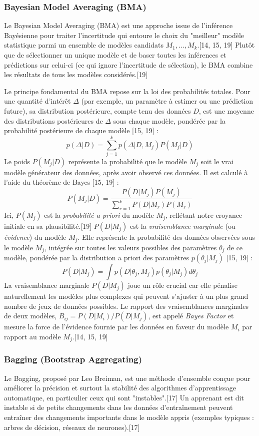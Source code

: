 \documentclass[11pt,a4paper]{article}
\begin{document}
\subsubsection{Bayesian Model Averaging (BMA)}
Le Bayesian Model Averaging (BMA) est une approche issue de l'inférence Bayésienne pour traiter l'incertitude qui entoure le choix du "meilleur" modèle statistique parmi un ensemble de modèles candidats $M_1, \dots, M_k$.[14, 15, 19] Plutôt que de sélectionner un unique modèle et de baser toutes les inférences et prédictions sur celui-ci (ce qui ignore l'incertitude de sélection), le BMA combine les résultats de tous les modèles considérés.[19]

Le principe fondamental du BMA repose sur la loi des probabilités totales. Pour une quantité d'intérêt $\Delta$ (par exemple, un paramètre à estimer ou une prédiction future), sa distribution postérieure, compte tenu des données $D$, est une moyenne des distributions postérieures de $\Delta$ sous chaque modèle, pondérée par la probabilité postérieure de chaque modèle [15, 19] :
$$p(\Delta | D) = \sum_{j=1}^{k} p(\Delta | D, M_j) P(M_j | D)$$
Le poids $P(M_j | D)$ représente la probabilité que le modèle $M_j$ soit le vrai modèle générateur des données, après avoir observé ces données. Il est calculé à l'aide du théorème de Bayes [15, 19] :
$$P(M_j | D) = \frac{P(D | M_j) P(M_j)}{\sum_{r=1}^{k} P(D | M_r) P(M_r)}$$
Ici, $P(M_j)$ est la \textit{probabilité a priori} du modèle $M_j$, reflétant notre croyance initiale en sa plausibilité.[19] $P(D | M_j)$ est la \textit{vraisemblance marginale} (ou \textit{évidence}) du modèle $M_j$. Elle représente la probabilité des données observées sous le modèle $M_j$, intégrée sur toutes les valeurs possibles des paramètres $\theta_j$ de ce modèle, pondérée par la distribution a priori des paramètres $p(\theta_j | M_j)$ [15, 19] :
$$P(D | M_j) = \int p(D | \theta_j, M_j) p(\theta_j | M_j) d\theta_j$$
La vraisemblance marginale $P(D | M_j)$ joue un rôle crucial car elle pénalise naturellement les modèles plus complexes qui peuvent s'ajuster à un plus grand nombre de jeux de données possibles. Le rapport des vraisemblances marginales de deux modèles, $B_{ij} = P(D | M_i) / P(D | M_j)$, est appelé \textit{Bayes Factor} et mesure la force de l'évidence fournie par les données en faveur du modèle $M_i$ par rapport au modèle $M_j$.[14, 15, 19]

\subsubsection{Bagging (Bootstrap Aggregating)}
Le Bagging, proposé par Leo Breiman, est une méthode d'ensemble conçue pour améliorer la précision et surtout la stabilité des algorithmes d'apprentissage automatique, en particulier ceux qui sont "instables".[17] Un apprenant est dit instable si de petits changements dans les données d'entraînement peuvent entraîner des changements importants dans le modèle appris (exemples typiques : arbres de décision, réseaux de neurones).[17]
\end{document}
